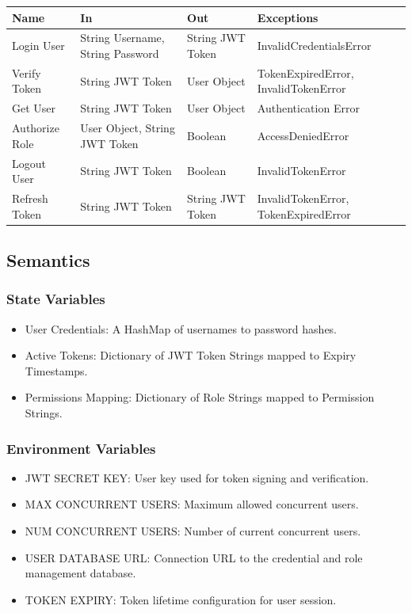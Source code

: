 \documentclass[12pt, titlepage]{article}
\begin{document}
\begin{center}
\begin{tabularx}{\textwidth}{l X X X}
\hline
\textbf{Name} & \textbf{In} & \textbf{Out} & \textbf{Exceptions} \\
\hline
Login User & String Username, String Password & String JWT Token & InvalidCredentialsError \\
Verify Token & String JWT Token & User Object & TokenExpiredError, InvalidTokenError \\
Get User & String JWT Token & User Object & Authentication Error \\
Authorize Role & User Object, String JWT Token & Boolean & AccessDeniedError \\
Logout User & String JWT Token & Boolean & InvalidTokenError \\
Refresh Token & String JWT Token & String JWT Token & InvalidTokenError, TokenExpiredError \\
\hline
\end{tabularx}
\end{center}

\subsection{Semantics}

\subsubsection{State Variables}

\begin{itemize}
  \item{User Credentials: A HashMap of usernames to password hashes.}
  \item{Active Tokens: Dictionary of JWT Token Strings mapped to Expiry Timestamps.}
  \item{Permissions Mapping: Dictionary of Role Strings mapped to Permission Strings.}
\end{itemize}

\subsubsection{Environment Variables}

\begin{itemize}
  \item{JWT SECRET KEY: User key used for token signing and verification.}
  \item{MAX CONCURRENT USERS: Maximum allowed concurrent users.}
  \item{NUM CONCURRENT USERS: Number of current concurrent users.}
  \item{USER DATABASE URL: Connection URL to the credential and role management database.}
  \item{TOKEN EXPIRY: Token lifetime configuration for user session.}
\end{itemize}
\end{document}

